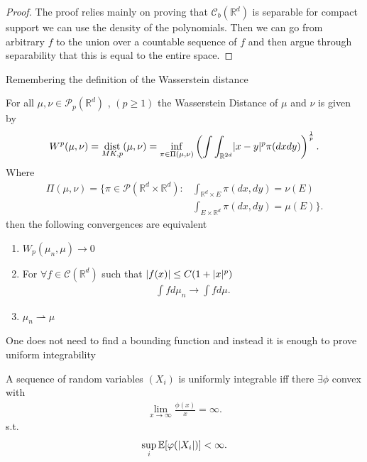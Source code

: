 \begin{proof}
 The proof relies mainly on proving that $\mathcal{C}_b(\mathbb{R}^{d} )$  is separable for compact support 
 we can use the density of the polynomials. Then we can go from arbitrary $f$ to the union over a countable sequence of $f$ 
 and then argue through separability that this is equal to the entire space.
\end{proof}
Remembering the definition of the Wasserstein distance 
\begin{definition}
  For all $\mu , \nu  \in  \mathcal{P}_p(\mathbb{R}^{d} )$  , $(p\ge 1) $ the Wasserstein Distance of $\mu $ and $\nu $ is given by 
  \begin{align*}
    W^{p}(\mu ,\nu ) = \operatorname*{dist}_{MK,p}(\mu ,\nu ) = \inf_{\pi \in  \Pi(\mu ,\nu )} \left( \int \int_{\mathbb{R}^{2d} } \lvert x-y\rvert^{p} \pi(dxdy) \right)^{\frac{1}{p}}  
  .\end{align*}
  Where  
  \begin{align*}
    \Pi(\mu ,\nu ) = \Bigg\{\pi \in \mathcal{P}(\mathbb{R}^{d} \times  \mathbb{R}^{d}  ) : &\int_{\mathbb{R}^{d}\times E } \pi(dx,dy) = \nu(E) \\
                                                                                      &\int_{E \times  \mathbb{R}^{d} } \pi(dx,dy) = \mu(E)\Bigg\}  
  .\end{align*}
  then the following convergences are equivalent
  \begin{enumerate}
   \item $W_p(\mu_n,\mu ) \to 0$
    \item  For $\forall f \in \mathcal{C}(\mathbb{R}^{d} )$ such that $\lvert f(x)\rvert \le  C(1+\lvert x\rvert^{p} )$
     \begin{align*}
      \int  f d\mu_n \to \int  f d\mu 
     .\end{align*} 
    \item $\mu_n \rightharpoonup \mu $
  \end{enumerate}
\end{definition}
\newpage
\begin{definition}
 One does not need to find a bounding function and instead it is enough to prove uniform integrability  
\end{definition}
\begin{lemma}\label{de_la_valle}
 A sequence of random variables $(X_i)$  is uniformly integrable iff there 
 $\exists \phi $ convex with
 \begin{align*}
   \lim_{x \to \infty} \frac{\phi(x)}{x} = \infty
 .\end{align*}
s.t.
\begin{align*}
 \sup_i \mathbb{E}[\varphi(\lvert X_i\rvert)] < \infty
.\end{align*}
\end{lemma}
